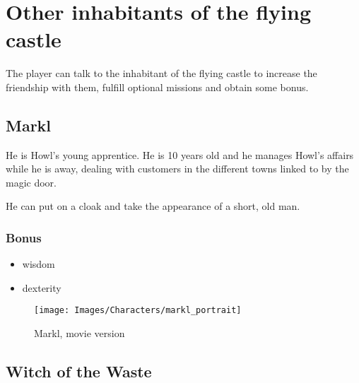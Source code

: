 \section{Other inhabitants of the flying castle}

The player can talk to the inhabitant of the flying castle to increase the friendship with them, fulfill optional missions and obtain some bonus.

\subsection{Markl}

\begin{minipage}{0.5\textwidth}
He is Howl’s young apprentice. He is 10 years old and he manages Howl's affairs while he is away, dealing with customers in the different towns linked to by the magic door.

He can put on a cloak and take the appearance of a short, old man.

\subsubsection{Bonus}
\begin{itemize}
	\item wisdom
	\item dexterity
\end{itemize}

\end{minipage}%
%
\hfill\begin{minipage}{0.4\textwidth}
  \begin{figure}[H]
    \hfill\texttt{[image: Images/Characters/markl\_portrait]}
    \caption{Markl, movie version}
  \end{figure}
\end{minipage}

\subsection{Witch of the Waste}


